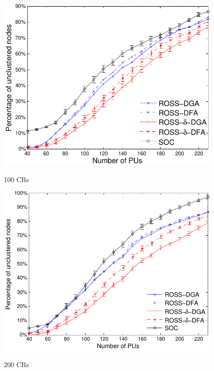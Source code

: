 \documentclass[times]{ettauth}
\theoremstyle{mytheoremstyle}
\theoremstyle{mytheoremstyle}
\theoremstyle{mytheoremstyle}
\begin{document}
\begin{figure}[t]
\begin{multicols}{3}
    \includegraphics[width=\linewidth]{survival_rate_100_edge50.pdf}\par\caption{100 CRs}\label{singleton_clusters_100}
    \includegraphics[width=\linewidth]{survival_rate_200_edge50.pdf}\par\caption{200 CRs}\label{singleton_clusters_200}

\end{multicols}
\end{figure}
\end{document}
